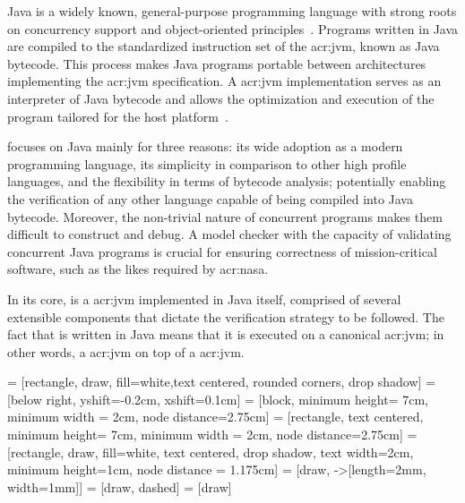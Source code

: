Java is a widely known, general-purpose programming language with strong roots on concurrency support and object-oriented principles~\cite{Gosling2014}. Programs written in Java are compiled to the standardized instruction set of the \acrfull{acr:jvm}, known as Java bytecode. This process makes Java programs portable between architectures implementing the \acrshort{acr:jvm} specification. A \acrshort{acr:jvm} implementation serves as an interpreter of Java bytecode and allows the optimization and execution of the program tailored for the host platform~\cite{Lindholm2014}.

\jpf{} focuses on Java mainly for three reasons: its wide adoption as a modern programming language, its simplicity in comparison to other high profile languages, and the flexibility in terms of bytecode analysis; potentially enabling the verification of any other language capable of being compiled into Java bytecode. Moreover, the non-trivial nature of concurrent programs makes them difficult to construct and debug. A model checker with the capacity of validating concurrent Java programs is crucial for ensuring correctness of mission-critical software, such as the likes required by \acrshort{acr:nasa}.

In its core, \jpf{} is a \acrlong{acr:jvm} implemented in Java itself, comprised of several extensible components that dictate the verification strategy to be followed. The fact that \jpf{} is written in Java means that it is executed on a canonical \acrshort{acr:jvm}; in other words, a \acrshort{acr:jvm} on top of a \acrshort{acr:jvm}. 

 = [rectangle, draw, fill=white,text centered, rounded corners, drop shadow]
 = [below right, yshift=-0.2cm, xshift=0.1cm]
 = [block, minimum height= 7cm, minimum width = 2cm, node distance=2.75cm]
 = [rectangle, text centered, minimum height= 7cm, minimum width = 2cm, node distance=2.75cm]
 = [rectangle, draw, fill=white, text centered, drop shadow, text width=2cm, minimum height=1cm, node distance = 1.175cm]
  = [draw, -{>[length=2mm, width=1mm]}]
 = [draw, dashed]
 = [draw]

